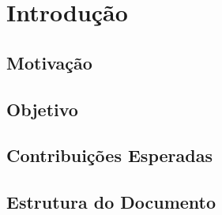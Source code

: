 \chapter{Introdução}

\section{Motivação}
\section{Objetivo}
\section{Contribuições Esperadas}
\section{Estrutura do Documento}